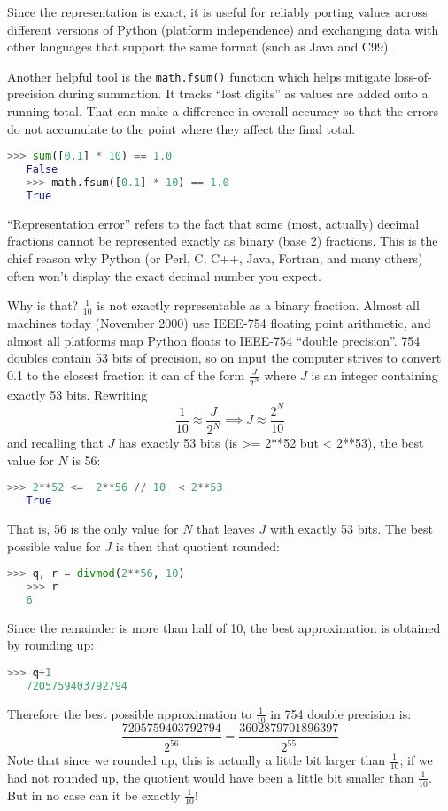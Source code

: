 Since the representation is exact, it is useful for reliably porting values across different versions of Python (platform independence) and exchanging data with other languages that support the same format (such as Java and C99).

Another helpful tool is the \lstinline|math.fsum()| function which helps mitigate loss-of-precision during summation.
It tracks ``lost digits'' as values are added onto a running total.
That can make a difference in overall accuracy so that the errors do not accumulate to the point where they affect the final total.
\begin{lstlisting}[language=Python]
   >>> sum([0.1] * 10) == 1.0
   False
   >>> math.fsum([0.1] * 10) == 1.0
   True\end{lstlisting}

``Representation error'' refers to the fact that some (most, actually) decimal fractions cannot be represented exactly as binary (base 2) fractions.
This is the chief reason why Python (or Perl, C, C++, Java, Fortran, and many others) often won’t display the exact decimal number you expect.

Why is that?
\(\frac{1}{10}\) is not exactly representable as a binary fraction.
Almost all machines today (November 2000) use IEEE-754 floating point arithmetic, and almost all platforms map Python floats to IEEE-754 “double precision”.
754 doubles contain 53 bits of precision, so on input the computer strives to convert 0.1 to the closest fraction it can of the form \(\frac{J}{2^N}\) where \(J\) is an integer containing exactly 53 bits.
Rewriting
\[\frac{1}{10} \approx \frac{J}{2^N} \implies J \approx \frac{2^N}{10}\]
and recalling that \(J\) has exactly 53 bits (is >= 2**52 but < 2**53), the best value for \(N\) is 56:
\begin{lstlisting}[language=Python]
   >>> 2**52 <=  2**56 // 10  < 2**53
   True\end{lstlisting}
That is, 56 is the only value for \(N\) that leaves \(J\) with exactly 53 bits.
The best possible value for \(J\) is then that quotient rounded:
\begin{lstlisting}[language=Python]
   >>> q, r = divmod(2**56, 10)
   >>> r
   6\end{lstlisting}
Since the remainder is more than half of 10, the best approximation is obtained by rounding up:
\begin{lstlisting}[language=Python]
   >>> q+1
   7205759403792794\end{lstlisting}
Therefore the best possible approximation to \(\frac{1}{10}\) in 754 double precision is:
\[\frac{7205759403792794}{2^{56}} = \frac{3602879701896397}{2^{55}}\]
Note that since we rounded up, this is actually a little bit larger than \(\frac{1}{10}\); if we had not rounded up, the quotient would have been a little bit smaller than \(\frac{1}{10}\).
But in no case can it be exactly \(\frac{1}{10}\)!

